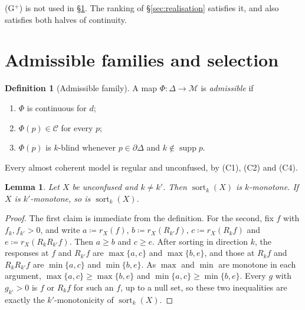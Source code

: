 \documentclass[11pt]{article}
\newcommand{\chg}[1]{{\color{red}#1}}
\newtheorem{lemma}[theorem]{Lemma}
\theoremstyle{definition}
\newtheorem{definition}[theorem]{Definition}
\theoremstyle{remark}
\newcommand{\M}{\mathcal M}
\newcommand{\C}{\mathcal C}
\newcommand{\bd}{\partial}
\newcommand{\supp}{\operatorname{supp}}
\begin{document}
(G$^+$) is not used in \S\ref{sec:selection}. The ranking of \S\ref{sec:realisation} satisfies it, and also satisfies both halves of continuity.

\section{Admissible families and selection}\label{sec:selection}

\begin{definition}[Admissible family]\label{def:admissible}
A map $\Phi:\Delta\to\M$ is \emph{admissible} if
\begin{enumerate}[label=($\Phi$\arabic*),leftmargin=3em]
\item $\Phi$ is continuous for $d$;
\item $\Phi(p)\in\C$ for every $p$;
\item $\Phi(p)$ is $k$-blind whenever $p\in\bd\Delta$ and $k\notin\supp p$.
\end{enumerate}
\end{definition}

Every almost coherent model is regular and unconfused, by (C1), (C2) and (C4).

\begin{lemma}\label{lem:compression}
Let $X$ be unconfused and $k\neq k'$. Then $\operatorname{sort}_k(X)$ is $k$-monotone. If $X$ is $k'$-monotone, so is $\operatorname{sort}_k(X)$.
\end{lemma}
\begin{proof}
The first claim is immediate from the definition. For the second, fix $f$ with $f_k,f_{k'}>0$, and write $a\coloneqq r_X(f)$, $b\coloneqq r_X(R_{k'}f)$, $c\coloneqq r_X(R_kf)$ and $e\coloneqq r_X(R_kR_{k'}f)$. Then $a\ge b$ and $c\ge e$. After sorting in direction $k$, the responses at $f$ and $R_{k'}f$ are $\max\{a,c\}$ and $\max\{b,e\}$, and those at $R_kf$ and $R_kR_{k'}f$ are $\min\{a,c\}$ and $\min\{b,e\}$. As $\max$ and $\min$ are monotone in each argument, $\max\{a,c\}\ge\max\{b,e\}$ and $\min\{a,c\}\ge\min\{b,e\}$. \chg{Every $g$ with $g_{k'}>0$ is $f$ or $R_kf$ for such an $f$, up to a null set, so these two inequalities are exactly the $k'$-monotonicity of $\operatorname{sort}_k(X)$.}
\end{proof}
\end{document}
